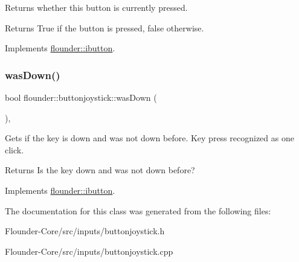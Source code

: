 Returns whether this button is currently pressed. 

\begin{DoxyReturn}{Returns}
True if the button is pressed, false otherwise. 
\end{DoxyReturn}


Implements \hyperlink{classflounder_1_1ibutton_af99b936d7329f74a27768ce6eb181327}{flounder\+::ibutton}.

\mbox{\label{classflounder_1_1buttonjoystick_a99302b1345fa773ec839290ae6c406e7}} 
\subsubsection{\texorpdfstring{was\+Down()}{wasDown()}}
{\footnotesize\ttfamily bool flounder\+::buttonjoystick\+::was\+Down (\begin{DoxyParamCaption}{ }\end{DoxyParamCaption})\hspace{0.3cm}{\ttfamily [override]}, {\ttfamily [virtual]}}



Gets if the key is down and was not down before. Key press recognized as one click. 

\begin{DoxyReturn}{Returns}
Is the key down and was not down before? 
\end{DoxyReturn}


Implements \hyperlink{classflounder_1_1ibutton_a5fb7b3493c0ea0e67bb9defc272da0d3}{flounder\+::ibutton}.



The documentation for this class was generated from the following files\+:\begin{DoxyCompactItemize}
\item 
Flounder-\/\+Core/src/inputs/buttonjoystick.\+h\item 
Flounder-\/\+Core/src/inputs/buttonjoystick.\+cpp\end{DoxyCompactItemize}
